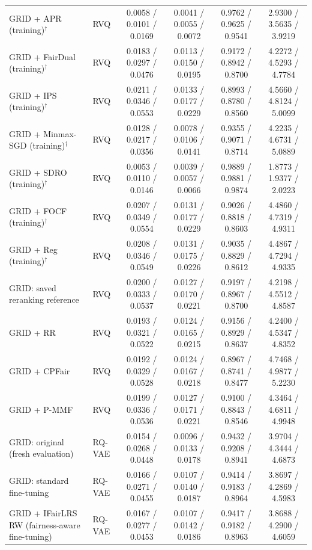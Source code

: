 \begin{table}[p]
{\begin{tabular}{llcccc}
GRID + APR (training)$^{\dagger}$ & RVQ & 0.0058 / 0.0101 / 0.0169 & 0.0041 / 0.0055 / 0.0072 & 0.9762 / 0.9625 / 0.9541 & 2.9300 / 3.5635 / 3.9219 \\
GRID + FairDual (training)$^{\dagger}$ & RVQ & 0.0183 / 0.0297 / 0.0476 & 0.0113 / 0.0150 / 0.0195 & 0.9172 / 0.8942 / 0.8700 & 4.2272 / 4.5293 / 4.7784 \\
GRID + IPS (training)$^{\dagger}$ & RVQ & 0.0211 / 0.0346 / 0.0553 & 0.0133 / 0.0177 / 0.0229 & 0.8993 / 0.8780 / 0.8560 & 4.5660 / 4.8124 / 5.0099 \\
GRID + Minmax-SGD (training)$^{\dagger}$ & RVQ & 0.0128 / 0.0217 / 0.0356 & 0.0078 / 0.0106 / 0.0141 & 0.9355 / 0.9071 / 0.8714 & 4.2235 / 4.6731 / 5.0889 \\
GRID + SDRO (training)$^{\dagger}$ & RVQ & 0.0053 / 0.0110 / 0.0146 & 0.0039 / 0.0057 / 0.0066 & 0.9889 / 0.9881 / 0.9874 & 1.8773 / 1.9377 / 2.0223 \\
GRID + FOCF (training)$^{\dagger}$ & RVQ & 0.0207 / 0.0349 / 0.0554 & 0.0131 / 0.0177 / 0.0229 & 0.9026 / 0.8818 / 0.8603 & 4.4860 / 4.7319 / 4.9311 \\
GRID + Reg (training)$^{\dagger}$ & RVQ & 0.0208 / 0.0346 / 0.0549 & 0.0131 / 0.0175 / 0.0226 & 0.9035 / 0.8829 / 0.8612 & 4.4867 / 4.7294 / 4.9335 \\
GRID: saved reranking reference & RVQ & 0.0200 / 0.0333 / 0.0537 & 0.0127 / 0.0170 / 0.0221 & 0.9197 / 0.8967 / 0.8700 & 4.2198 / 4.5512 / 4.8587 \\
GRID + RR & RVQ & 0.0193 / 0.0321 / 0.0522 & 0.0124 / 0.0165 / 0.0215 & 0.9156 / 0.8929 / 0.8637 & 4.2400 / 4.5347 / 4.8352 \\
GRID + CPFair & RVQ & 0.0192 / 0.0329 / 0.0528 & 0.0124 / 0.0167 / 0.0218 & 0.8967 / 0.8741 / 0.8477 & 4.7468 / 4.9877 / 5.2230 \\
GRID + P-MMF & RVQ & 0.0199 / 0.0336 / 0.0536 & 0.0127 / 0.0171 / 0.0221 & 0.9100 / 0.8843 / 0.8546 & 4.3464 / 4.6811 / 4.9948 \\
\midrule
GRID: original (fresh evaluation) & RQ-VAE & 0.0154 / 0.0268 / 0.0448 & 0.0096 / 0.0133 / 0.0178 & 0.9432 / 0.9208 / 0.8941 & 3.9704 / 4.3444 / 4.6873 \\
GRID: standard fine-tuning & RQ-VAE & 0.0166 / 0.0271 / 0.0455 & 0.0107 / 0.0140 / 0.0187 & 0.9414 / 0.9183 / 0.8964 & 3.8697 / 4.2869 / 4.5983 \\
GRID + IFairLRS RW (fairness-aware fine-tuning) & RQ-VAE & 0.0167 / 0.0277 / 0.0453 & 0.0107 / 0.0142 / 0.0186 & 0.9417 / 0.9182 / 0.8963 & 3.8688 / 4.2900 / 4.6059 \\

\end{tabular}}
\end{table}

